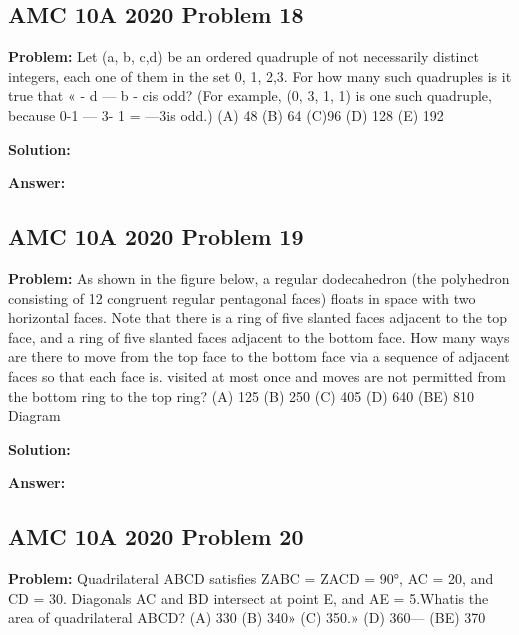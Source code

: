 \documentclass{article}
\newenvironment{problem}{\textbf{Problem: }}{\\}
\newenvironment{solution}{\textbf{Solution: }}{\\}
\newenvironment{answer}{\textbf{Answer: }}{\\}
\begin{document}
\subsection{AMC 10A 2020 Problem 18}

\begin{problem}
Let (a, b, c,d) be an ordered quadruple of not necessarily distinct integers, each one of them in the set 0, 1, 2,3. For how many such quadruples is it true that « - d — b - cis odd? (For example, (0, 3, 1, 1) is one such quadruple, because 0-1 — 3- 1 = —3is odd.) (A) 48 (B) 64 (C)96 (D) 128 (E) 192
\end{problem}

\begin{solution}
\end{solution}

\begin{answer}
\end{answer}

\subsection{AMC 10A 2020 Problem 19}

\begin{problem}
As shown in the figure below, a regular dodecahedron (the polyhedron consisting of 12 congruent regular pentagonal faces) floats in space with two horizontal faces. Note that there is a ring of five slanted faces adjacent to the top face, and a ring of five slanted faces adjacent to the bottom face. How many ways are there to move from the top face to the bottom face via a sequence of adjacent faces so that each face is. visited at most once and moves are not permitted from the bottom ring to the top ring? (A) 125 (B) 250 (C) 405 (D) 640 (BE) 810 Diagram
\end{problem}

\begin{solution}
\end{solution}

\begin{answer}
\end{answer}

\subsection{AMC 10A 2020 Problem 20}

\begin{problem}
Quadrilateral ABCD satisfies ZABC = ZACD = 90°, AC = 20, and CD = 30. Diagonals AC and BD intersect at point E, and AE = 5.Whatis the area of quadrilateral ABCD? (A) 330 (B) 340» (C) 350.» (D) 360— (BE) 370
\end{problem}
\end{document}
